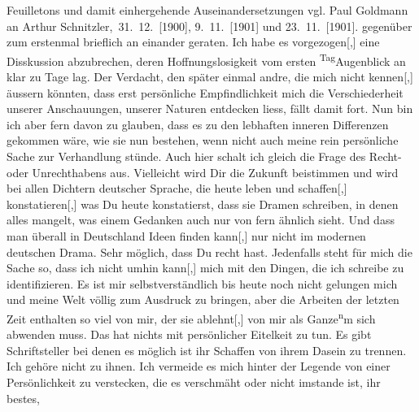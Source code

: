 \begin{ledgroupsized}[t]{13cm}
{{{                  Feuilletons und damit einhergehende Auseinandersetzungen vgl. Paul Goldmann an Arthur Schnitzler, 31. 12. [1900], 9. 11. [1901] und 23. 11. [1901].
               }}}\label{K_L03520-2h} gegenüber zum erstenmal brieflich an einander geraten. Ich habe es
                  vorgezogen{[},{]} eine Disskussion abzubrechen, deren
               Hoffnungslosigkeit vom ersten \substVorne{}\textsuperscript{Tag}\substDazwischen{}Augenblick\substHinten{} an klar zu Tage lag. Der Verdacht, den später einmal andre, die mich nicht
                  kennen{[},{]} äussern könnten, dass erst persönliche
               Empfindlichkeit mich die Verschiederheit unserer Anschauungen\introOben{},\introOben{} unserer Naturen entdecken liess, fällt damit fort. Nun bin ich aber fern
               davon zu glauben, dass es zu den lebhaften inneren Differenzen gekommen wäre, wie sie
               nun bestehen, wenn nicht auch meine rein persönliche Sache zur Verhandlung stünde.
               Auch hier schalt ich gleich die Frage des Recht- oder Unrechthabens aus. Vielleicht
               wird Dir die Zukunft beistimmen und wird bei allen Dichtern deutscher Sprache, die
               heute leben und schaffen{[},{]} konstatieren{[},{]} was
               Du heute konstatierst, dass sie Dramen schreiben, in denen alles mangelt, {\pb}was einem Gedanken auch nur von fern
               ähnlich sieht. Und dass man überall in Deutschland Ideen finden kann{[},{]} nur nicht im modernen
               deutschen Drama. Sehr möglich, dass Du recht hast. Jedenfalls steht für mich die
               Sache so, dass ich nicht umhin kann{[},{]} mich mit den Dingen, die
               ich schreibe zu identifizieren. Es ist mir selbstverständlich bis heute noch nicht
               gelungen mich und meine Welt völlig zum Ausdruck zu bringen, aber die Arbeit\introOben{}en\introOben{} der letzten Zeit enthalten so viel von mir, \label{T_L03520-4v}\label{T_L03520-4h} der sie
                  ablehnt{[},{]} von mir als Ganze\substVorne{}\textsuperscript{n}\substDazwischen{}m\substHinten{} sich abwenden muss. Das hat nichts mit persönlicher Eitelkeit zu tun. Es
               gibt Schriftsteller bei denen es möglich ist ihr Schaffen von ihrem Dasein zu
               trennen. Ich gehöre nicht zu ihnen. Ich vermeide es mich hinter der Legende von einer
               Persönlichkeit zu verstecken, die es verschmäht oder nicht imstande ist, ihr bestes,

\end{ledgroupsized}

